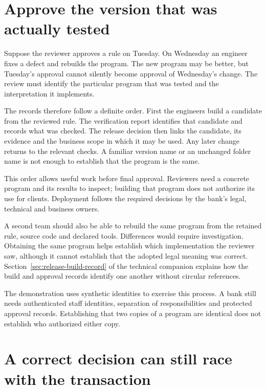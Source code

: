 \section{Approve the version that was actually tested}
\label{merge:M07:12}

Suppose the reviewer approves a rule on Tuesday. On Wednesday an engineer fixes
a defect and rebuilds the program. The new program may be better, but Tuesday's
approval cannot silently become approval of Wednesday's change. The review must
identify the particular program that was tested and the interpretation it
implements.

The records therefore follow a definite order. First the engineers build a
candidate from the reviewed rule. The verification report identifies that
candidate and records what was checked. The release decision then links the
candidate, its evidence and the business scope in which it may be used. Any
later change returns to the relevant checks. A familiar version name or an
unchanged folder name is not enough to establish that the program is the same.



This order allows useful work before final approval. Reviewers need a concrete
program and its results to inspect; building that program does not authorize its
use for clients. Deployment follows the required decisions by the bank's legal,
technical and business owners.

A second team should also be able to rebuild the same program from the retained
rule, source code and declared tools. Differences would require investigation.
Obtaining the same program helps establish which implementation the reviewer
saw, although it cannot establish that the adopted legal meaning was correct.
Section~\ref{sec:release-build-record} of the technical companion explains how
the build and approval records identify one another without circular references.

The demonstration uses synthetic identities to exercise this process. A bank
still needs authenticated staff identities, separation of responsibilities and
protected approval records. Establishing that two copies of a program are
identical does not establish who authorized either copy.

\section{A correct decision can still race with the transaction}
\label{merge:M07:13}


